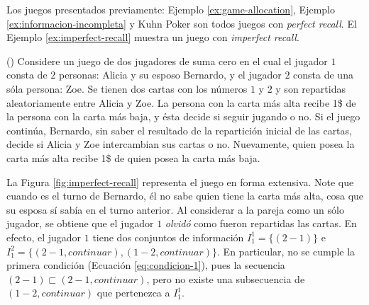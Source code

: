 Los juegos presentados previamente: Ejemplo \ref{ex:game-allocation}, Ejemplo \ref{ex:informacion-incompleta} y Kuhn Poker son todos juegos con \textit{perfect recall}. El Ejemplo \ref{ex:imperfect-recall} muestra un juego con \textit{imperfect recall}.

\begin{example} (\cite{bib:conceptos-basicos})
\label{ex:imperfect-recall}
Considere un juego de dos jugadores de suma cero en el cual el jugador $1$ consta de $2$ personas: Alicia y su esposo Bernardo, y el jugador $2$ consta de una sóla persona: Zoe. Se tienen dos cartas con los números $1$ y $2$ y son repartidas aleatoriamente entre Alicia y Zoe. La persona con la carta más alta recibe 1\$ de la persona con la carta más baja, y ésta decide si seguir jugando o no. Si el juego continúa, Bernardo, sin saber el resultado de la repartición inicial de las cartas, decide si Alicia y Zoe intercambian sus cartas o no. Nuevamente, quien posea la carta más alta recibe 1\$ de quien posea la carta más baja.
\end{example}

 La Figura \ref{fig:imperfect-recall} representa el juego en forma extensiva. Note que cuando es el turno de Bernardo, él no sabe quien tiene la carta más alta, cosa que su esposa sí sabía en el turno anterior. Al considerar a la pareja como un sólo jugador, se obtiene que el jugador $1$ \textit{olvidó} como fueron repartidas las cartas. En efecto, el jugador $1$ tiene dos conjuntos de información $I^1_1 = \{(2-1) \}$ e $I^2_1 = \{(2-1, continuar), (1-2, continuar) \}$. En particular, no se cumple la primera condición (Ecuación \ref{eq:condicion-1}), pues la secuencia $(2-1) \sqsubset (2-1, continuar)$, pero no existe una subsecuencia de $(1-2, continuar)$ que pertenezca a $I^1_1$.

